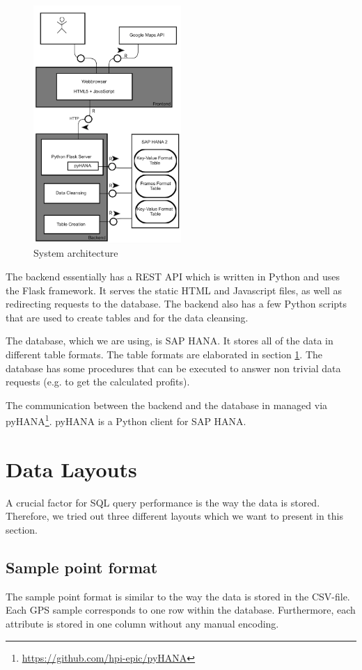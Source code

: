 \documentclass[10pt]{sig-alternate}
\begin{document}
\begin{figure}[ht]
\centering
\includegraphics[width=0.5\textwidth]{img/architecture.png}
\caption{System architecture}
\label{fig:architecture}
\end{figure}

The backend essentially has a REST API which is written in Python and uses the Flask framework. It serves the static HTML and Javascript files, as well as redirecting requests to the database. The backend also has a few Python scripts that are used to create tables and for the data cleansing.

The database, which we are using, is SAP HANA. It stores all of the data in different table formats. The table formats are elaborated in section \ref{sec:data_layouts}. The database has some procedures that can be executed to answer non trivial data requests (e.g. to get the calculated profits).

The communication between the backend and the database in managed via pyHANA\footnote{\href{https://github.com/hpi-epic/pyHANA}{https://github.com/hpi-epic/pyHANA}}. pyHANA is a Python client for SAP HANA.


\section{Data Layouts}
\label{sec:data_layouts}
A crucial factor for SQL query performance is the way the data is stored. Therefore, we tried out three different layouts which we want to present in this section.
\subsection{Sample point format}
The sample point format is similar to the way the data is stored in the CSV-file. Each GPS sample corresponds to one row within the database. Furthermore, each attribute is stored in one column without any manual encoding.
\end{document}
